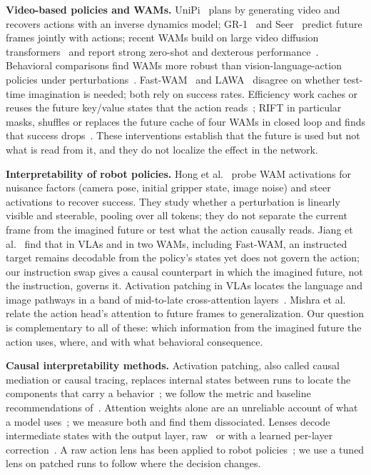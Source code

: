 \documentclass[conference]{IEEEtran}
\begin{document}
\textbf{Video-based policies and WAMs.} UniPi~\cite{du2023unipi} plans by generating video and recovers actions with
an inverse dynamics model; GR-1~\cite{wu2023gr1} and Seer~\cite{tian2024seer} predict future frames jointly with
actions; recent WAMs build on large video diffusion transformers~\cite{wan2025wan,peebles2022dit} and report strong
zero-shot and dexterous performance~\cite{ye2026dreamzero,bi2026motus2}. Behavioral comparisons find WAMs more
robust than vision-language-action policies under perturbations~\cite{zhang2026wamrobust}. Fast-WAM~\cite{yuan2026fastwam}
and LAWA~\cite{li2026lawa} disagree on whether test-time imagination is needed; both rely on success rates. Efficiency
work caches or reuses the future key/value states that the action reads~\cite{ding2026wamcache,zhang2026rift}; RIFT
in particular masks, shuffles or replaces the future cache of four WAMs in closed loop and finds that success
drops~\cite{zhang2026rift}. These interventions establish that the future is used but not what is read from it, and they
do not localize the effect in the network.

\textbf{Interpretability of robot policies.} Hong et al.~\cite{hong2026steering} probe WAM activations for nuisance
factors (camera pose, initial gripper state, image noise) and steer activations to recover success. They study whether
a perturbation is linearly visible and steerable, pooling over all tokens; they do not separate the current frame from
the imagined future or test what the action causally reads. Jiang et al.~\cite{jiang2026encoded} find that in VLAs and
in two WAMs, including Fast-WAM, an instructed target remains decodable from the policy's states yet does not govern the
action; our instruction swap gives a causal counterpart in which the imagined future, not the instruction, governs it.
Activation patching in VLAs locates the language and image pathways in a band of mid-to-late cross-attention
layers~\cite{swann2026causal,wulff2026vla}. Mishra et al.~\cite{mishra2026temporal} relate the action head's attention
to future frames to generalization. Our question is complementary to all of these: which information from the
imagined future the action uses, where, and with what behavioral consequence.

\textbf{Causal interpretability methods.} Activation patching, also called causal mediation or causal tracing, replaces
internal states between runs to locate the components that carry a behavior~\cite{vig2020causal,meng2022rome}; we
follow the metric and baseline recommendations of~\cite{zhang2023patching,heimersheim2024patching}. Attention weights
alone are an unreliable account of what a model uses~\cite{jain2019attention,wiegreffe2019attention}; we measure both
and find them dissociated. Lenses decode intermediate states with the output layer, raw~\cite{nostalgebraist2020logitlens}
or with a learned per-layer correction~\cite{belrose2023tuned}. A raw action lens has been applied to robot
policies~\cite{jiang2026encoded}; we use a tuned lens on patched runs to follow where the decision changes.
\end{document}
